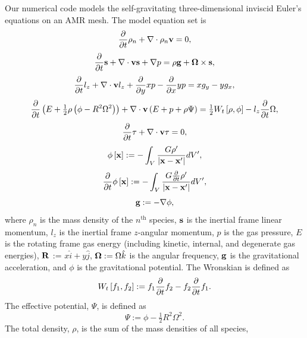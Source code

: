 \documentclass[preprint]{aastex}
\begin{document}
Our numerical code models the self-gravitating three-dimensional inviscid Euler's equations on an AMR mesh. The model equation set is
\begin{equation}
\label{rho_eq}
\frac{\partial}{\partial t} \rho_n + {\bf{\nabla }} \cdot  \rho_n {\bf{v}} = 0,
\end{equation}
\begin{equation} 
\label{mom_eq}
\frac{\partial}{\partial t} {\bf{s}} + {\bf{\nabla }} \cdot {\bf{v}} {\bf{s}} + {\bf{\nabla }} p = \rho {\bf{g}} +  {\bf{\Omega}} \times {\bf{s}},
\end{equation}
\begin{equation} 
\label{lz_eq}
\frac{\partial}{\partial t} l_z + {\bf{\nabla }} \cdot {\bf{v}} l_z + \frac{\partial}{\partial y} x p - \frac{\partial}{\partial x} y p  = x g_y - y g_x,
\end{equation}
\begin{equation} 
\label{etot_eq}
\frac{\partial}{\partial t} \left( E + \tfrac{1}{2}\rho\left( \phi -  R^2 \Omega^2 \right) \right)  + {\bf{\nabla }} \cdot {\bf{v}} \left( E +  p + \rho \Psi \right) = \tfrac{1}{2} W_t \left[ \rho, \phi \right] - l_z \frac{\partial}{\partial t} \Omega, 
\end{equation}
\begin{equation}
\label{tau_eq}
\frac{\partial}{\partial t} \tau + {\bf{\nabla }} \cdot {\bf{v}} \tau = 0,
\end{equation}
\begin{equation}
\phi\left[{\bf{x}}\right] := - \int_V \frac{ G \rho'}{\left| {\bf{x}} - {\bf{x'}}\right|} dV',
\end{equation}
\begin{equation}
\frac{\partial}{\partial t} \phi\left[{\bf{x}}\right] := - \int_V \frac{ G \frac{\partial}{\partial t} \rho'}{\left| {\bf{x}} - {\bf{x'}}\right|} dV',
\end{equation}
\begin{equation}
\label{g_eq}
{\bf{g}} := -{\bf{\nabla }} \phi,
\end{equation}
where $\rho_n$ is the mass density of the $n^\mathrm{th}$ species, ${\bf{s}}$ is the inertial 
frame linear momentum, $l_z$ is the inertial frame $z$-angular momentum, $p$ is the gas pressure,
 $E$ is the rotating frame 
gas energy (including kinetic, internal, and degenerate gas energies), ${\bf{R}}$ := $x \hat{i} + y \hat{j}$, ${\bf{\Omega}} := \Omega \hat{k}$ is the angular frequency, ${\bf{g}}$ is 
the gravitational acceleration, and $\phi$ is the gravitational potential. The Wronskian is defined as 
\begin{equation}
W_t\left[ f_1, f_2 \right] := f_1 \frac{\partial}{\partial t} f_2 - f_2 \frac{\partial}{\partial t} f_1.
\end{equation}
The effective potential, $\Psi$, is defined as
\begin{equation}
\Psi := \phi - \tfrac{1}{2} R^2 \Omega^2.
\end{equation} The total density, $\rho$, is the sum of the mass densities of all species,
\end{document}
